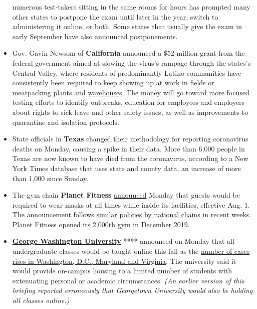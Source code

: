 \begin{itemize}
  numerous test-takers sitting in the same rooms for hours has prompted
  many other states to postpone the exam until later in the year, switch
  to administering it online, or both. Some states that usually give the
  exam in early September have also announced postponements.
\item
  Gov. Gavin Newsom of \textbf{California} announced a \$52 million
  grant from the federal government aimed at slowing the virus's rampage
  through the states's Central Valley, where residents of predominantly
  Latino communities have consistently been required to keep showing up
  at work in fields or meatpacking plants and
  \href{https://www.nytimes3xbfgragh.onion/2020/07/22/us/coronavirus-ca-warehouse-workers.html}{warehouses}.
  The money will go toward more focused testing efforts to identify
  outbreaks, education for employees and employers about rights to sick
  leave and other safety issues, as well as improvements to quarantine
  and isolation protocols.
\item
  State officials in \textbf{Texas} changed their methodology for
  reporting coronavirus deaths on Monday, causing a spike in their data.
  More than 6,000 people in Texas are now known to have died from the
  coronavirus, according to a New York Times database that uses state
  and county data, an increase of more than 1,000 since Sunday.
\item
  The gym chain \textbf{Planet Fitness}
  \href{https://www.planetfitness.com/club-cleanliness}{announced}
  Monday that guests would be required to wear masks at all times while
  inside its facilities, effective Aug. 1. The announcement follows
  \href{https://www.nytimes3xbfgragh.onion/article/which-stores-require-masks.html}{similar
  policies by national chains} in recent weeks. Planet Fitness opened
  its 2,000th gym in December 2019.
\item
  \textbf{\href{https://coronavirus.gwu.edu/}{George Washington
  University}} **** announced on Monday that all undergraduate classes
  would be taught online this fall as the
  \href{https://www.nytimes3xbfgragh.onion/interactive/2020/us/coronavirus-us-cases.html?action=click\&pgtype=Article\&state=default\&module=styln-coronavirus\&region=TOP_BANNER\&context=storylines_menu}{number
  of cases rises in Washington, D.C., Maryland and Virginia}. The
  university said it would provide on-campus housing to a limited number
  of students with extenuating personal or academic circumstances.
  \emph{(An earlier version of this briefing reported erroneously that
  Georgetown University would also be holding all classes online.)}

\end{itemize}
